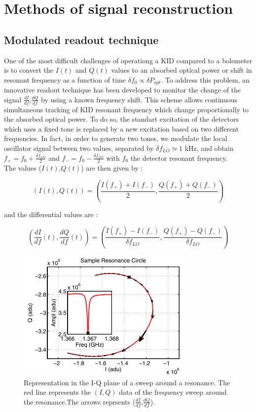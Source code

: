\section{Methods of signal reconstruction}
\subsection{Modulated readout technique}
One of the most difficult challenges of operationg a KID compared to a bolometer is to convert the $I(t)$ and $Q(t)$ values to an absorbed optical power or shift in resonant frequency as a function of time $\delta f_{0} \propto \delta P_{opt}$. To address this problem, an innovative readout technique has been developed to monitor the change of the signal $\frac{dI}{df}$,$\frac{dQ}{df}$ by using a known frequency shift. This scheme allows continuous simultaneous tracking of KID resonant frequency which change proportionally to the absorbed optical power. To do so, the standart excitation of the detectors which uses a fixed tone is replaced by a new excitation based on two different frequencies. In fact, in order to generate two tones, we modulate the local oscillator signal between two values, separated by $\delta f_{LO} \simeq 1$ kHz, and obtain $f_{+} = f_{0} + \frac{\delta f_{LO}}{2}$ and $f_{-} = f_{0} - \frac{\delta f_{LO}}{2}$ with $f_{0}$ the detector resonant frequency.\\
The values ($I(t)$,$Q(t)$) are then given by :

\begin{equation}
(I(t),Q(t)) = (\frac{I(f_{+}) + I(f_{-})}{2}, \frac{Q(f_{+}) + Q(f_{-})}{2})
\end{equation}

and the differential values are :

\begin{equation}
\label{gradient}
(\frac{dI}{df}(t),\frac{dQ}{df}(t)) = (\frac{I(f_{+}) - I(f_{-})}{\delta f_{LO}}, \frac{Q(f_{+}) - Q(f_{-})}{\delta f_{LO}})
\end{equation}

\begin{figure}[h]
\center
	\includegraphics[scale=0.5]{resonance-circle.png}
	\caption{Representation in the I-Q plane of a sweep around a resonance. The red line represents the $(I,Q)$ data of the frequency sweep around the resonance.The arrows reprsents ($\frac{dI}{df}$,$\frac{dQ}{df}$). \citep{2013A&A...551L..12C}}
	\label{circle-iq}
\end{figure}

